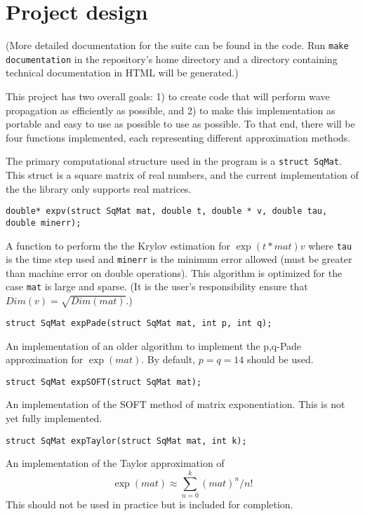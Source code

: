 \documentclass{article}
\theoremstyle{exampstyle} \newtheorem*{remark}{Remark}
\newcommand{\1}{\mathds{1}}
\begin{document}

\section{Project design}

(More detailed documentation for the suite can be found in the code. Run \texttt{make documentation} in the repository's home directory and a directory containing technical documentation in HTML will be generated.)

This project has two overall goals: 1) to create code that will perform wave propagation as efficiently as possible, and 2) to make this implementation as portable and easy to use as possible to use as possible. To that end, there will be four functions implemented, each representing different approximation methods.

The primary computational structure used in the program is a \texttt{struct SqMat}. This struct is a square matrix of real numbers, and the current implementation of the the library only supports real matrices. 
\newline

\texttt{double* expv(struct SqMat mat, double t, double * v, double tau, double minerr);}

A function to perform the the Krylov estimation for $\exp(t*mat)v$ where \texttt{tau} is the time step used and \texttt{minerr} is the minimum error allowed (must be greater than machine error on double operations). This algorithm is optimized for the case \texttt{mat} is large and sparse. (It is the user's responsibility ensure that $Dim(v)=\sqrt{Dim(mat)}$.)  
\newline

\texttt{struct SqMat expPade(struct SqMat mat, int p, int q);}

An implementation of an older algorithm to implement the p,q-Pade approximation for $\exp(mat)$. By default, $p=q=14$ should be used.  
\newline

\texttt{struct SqMat expSOFT(struct SqMat mat);}

An implementation of the SOFT method of matrix exponentiation. This is not yet fully implemented.
\newline

\texttt{struct SqMat expTaylor(struct SqMat mat, int k);}

An implementation of the Taylor approximation of 
$$\exp(mat)\approx\sum_{n=0}^k(mat)^n/n!$$
This should not be used in practice but is included for completion.
\newline
\end{document}
